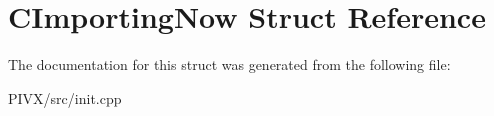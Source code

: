 \hypertarget{struct_c_importing_now}{}\section{C\+Importing\+Now Struct Reference}
\label{struct_c_importing_now}


The documentation for this struct was generated from the following file\+:\begin{DoxyCompactItemize}
\item 
P\+I\+V\+X/src/init.\+cpp\end{DoxyCompactItemize}
